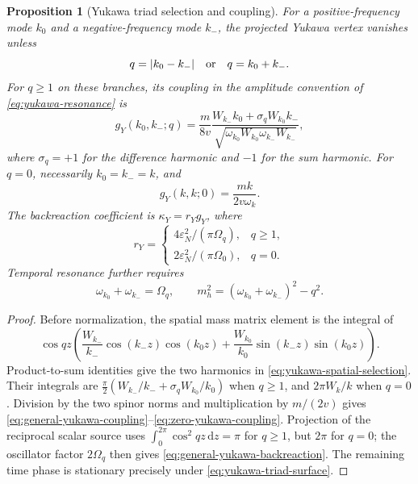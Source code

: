 \documentclass[11pt,a4paper,oneside]{book}
\theoremstyle{plain}
\newtheorem{proposition}[theorem]{Proposition}
\theoremstyle{definition}
\theoremstyle{remark}
\newcommand{\dd}{\mathrm d}
\newcommand{\src}[2]{\cite{#1}}
\begin{document}
\begin{proposition}[Yukawa triad selection and coupling]
\label{prop:general-yukawa-triad}
For a positive-frequency mode $k_0$ and a negative-frequency mode $k_-$,
the projected Yukawa vertex vanishes unless
\begin{equation}
 q=|k_0-k_-|\quad\hbox{or}\quad q=k_0+k_-.
 \label{eq:yukawa-spatial-selection}
\end{equation}
For $q\ge1$ on these branches, its coupling in the amplitude convention
of \eqref{eq:yukawa-resonance} is
\begin{equation}
 g_Y(k_0,k_-;q)
 =\frac{m}{8v}
  \frac{W_{k_-}k_0+\sigma_qW_{k_0}k_-}
       {\sqrt{\omega_{k_0}W_{k_0}\omega_{k_-}W_{k_-}}},
 \label{eq:general-yukawa-coupling}
\end{equation}
where $\sigma_q=+1$ for the difference harmonic and $-1$ for the sum
harmonic.  For $q=0$, necessarily $k_0=k_-=k$, and
\begin{equation}
 g_Y(k,k;0)=\frac{mk}{2v\omega_k}.
 \label{eq:zero-yukawa-coupling}
\end{equation}
The backreaction coefficient is $\kappa_Y=r_Yg_Y$, where
\begin{equation}
 r_Y=\begin{cases}
 4\varepsilon_N^2/(\pi\Omega_q),&q\ge1,\\
 2\varepsilon_N^2/(\pi\Omega_0),&q=0.
 \end{cases}
 \label{eq:general-yukawa-backreaction}
\end{equation}
Temporal resonance further requires
\begin{equation}
 \omega_{k_0}+\omega_{k_-}=\Omega_q,
 \qquad
 m_h^2=(\omega_{k_0}+\omega_{k_-})^2-q^2.
 \label{eq:yukawa-triad-surface}
\end{equation}
\end{proposition}
\begin{proof}
Before normalization, the spatial mass matrix element is the integral of
\[
 \cos qz\left(
 \frac{W_{k_-}}{k_-}\cos(k_-z)\cos(k_0z)
 +\frac{W_{k_0}}{k_0}\sin(k_-z)\sin(k_0z)\right).
\]
Product-to-sum identities give the two harmonics in
\eqref{eq:yukawa-spatial-selection}.  Their integrals are
$\tfrac\pi2(W_{k_-}/k_-+\sigma_qW_{k_0}/k_0)$ when $q\ge1$,
and $2\pi W_k/k$ when $q=0$.  Division by the two spinor norms and
multiplication by $m/(2v)$ gives
\eqref{eq:general-yukawa-coupling}--\eqref{eq:zero-yukawa-coupling}.
Projection of the reciprocal scalar source uses
$\int_0^{2\pi}\cos^2qz\,\dd z=\pi$ for $q\ge1$, but $2\pi$ for
$q=0$; the oscillator factor $2\Omega_q$ then gives
\eqref{eq:general-yukawa-backreaction}.  The remaining time phase is
stationary precisely under \eqref{eq:yukawa-triad-surface}.
\end{proof}
\src{R20}{thm:v20v31-modes,thm:v20v31-selection,thm:v20v31-coupling,prop:v20v31-manifold}
\end{document}

